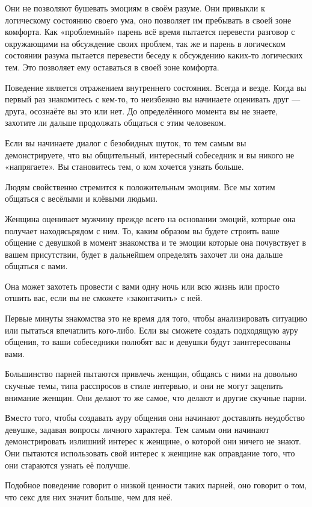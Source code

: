 Они не позволяют бушевать эмоциям в своём разуме. Они привыкли к логическому состоянию своего ума, оно позволяет им пребывать в своей зоне комфорта. Как «проблемный» парень всё время пытается перевести разговор с окружающими на обсуждение своих проблем, так же и парень в логическом состоянии разума пытается перевести беседу к обсуждению каких-то логических тем. Это позволяет ему оставаться в своей зоне комфорта.

Поведение является отражением внутреннего состояния. Всегда и везде. Когда вы первый раз знакомитесь с кем-то, то неизбежно вы начинаете оценивать друг --- друга, осознаёте вы это или нет. До определённого момента вы не знаете, захотите ли дальше продолжать общаться с этим человеком.

Если вы начинаете диалог с безобидных шуток, то тем самым вы демонстрируете, что вы общительный, интересный собеседник и вы никого не «напрягаете». Вы становитесь тем, о ком хочется узнать больше.

Людям свойственно стремится к положительным эмоциям. Все мы хотим общаться с весёлыми и клёвыми людьми.

Женщина оценивает мужчину прежде всего на основании эмоций, которые она получает находясьрядом с ним. То, каким образом вы будете строить ваше общение с девушкой в момент знакомства и те эмоции которые она почувствует в вашем присутствии, будет в дальнейшем определять захочет ли она дальше общаться с вами.

Она может захотеть провести с вами одну ночь или всю жизнь или просто отшить вас, если вы не сможете «законтачить» с ней.

Первые минуты знакомства это не время для того, чтобы анализировать ситуацию или пытаться впечатлить кого-либо. Если вы сможете создать подходящую ауру общения, то ваши собеседники полюбят вас и девушки будут заинтересованы вами.

Большинство парней пытаются привлечь женщин, общаясь с ними на довольно скучные темы, типа расспросов в стиле интервью, и они не могут зацепить внимание женщин. Они делают то же самое, что делают и другие скучные парни.

Вместо того, чтобы создавать ауру общения они начинают доставлять неудобство девушке, задавая вопросы личного характера. Тем самым они начинают демонстрировать излишний интерес к женщине, о которой они ничего не знают. Они пытаются использовать свой интерес к женщине как оправдание того, что они стараются узнать её получше.

Подобное поведение говорит о низкой ценности таких парней, оно говорит о том, что секс для них значит больше, чем для неё.

